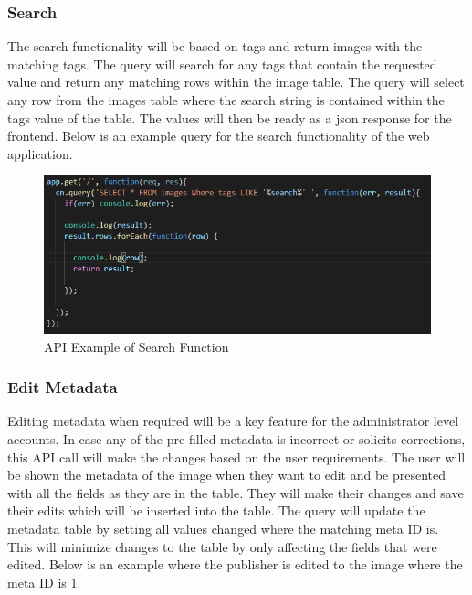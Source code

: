 \documentclass[12pt]{article}
\begin{document}
\newpage

\subsubsection{Search}

The search functionality will be based on tags and return images with the matching tags.  The query will search for any tags that contain the requested value and return any matching rows within the image table.  The query will select any row from the images table where the search string is contained within the tags value of the table.  The values will then be ready as a json response for the frontend.  Below is an example query for the search functionality of the web application.

\begin{figure}[h]
	\centering
	\includegraphics[scale=0.5]{api_search}
	\caption{API Example of Search Function}
	\label{fig:API Search}
\end{figure}

\subsubsection{Edit Metadata}

Editing metadata when required will be a key feature for the administrator level accounts.  In case any of the pre-filled metadata is incorrect or solicits corrections, this API call will make the changes based on the user requirements.  The user will be shown the metadata of the image when they want to edit and be presented with all the fields as they are in the table.  They will make their changes and save their edits which will be inserted into the table.  The query will update the metadata table by setting all values changed where the matching meta ID is.  This will minimize changes to the table by only affecting the fields that were edited.  Below is an example where the publisher is edited to the image where the meta ID is 1.
\end{document}
